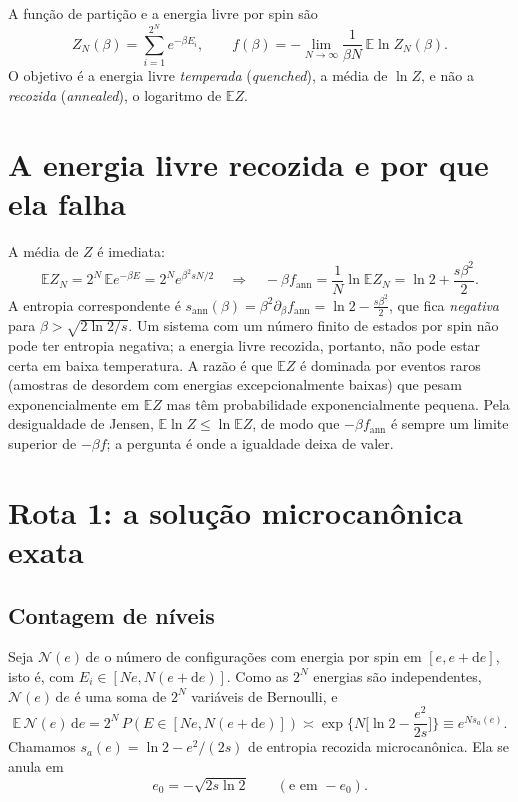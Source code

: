 \documentclass[11pt,a4paper]{article}
\newcommand{\E}{\mathbb{E}}
\newcommand{\dd}{\mathrm{d}}
\begin{document}
A função de partição e a energia livre por spin são
\begin{equation}
  Z_N(\beta)=\sum_{i=1}^{2^N} e^{-\beta E_i},
  \qquad
  f(\beta)=-\lim_{N\to\infty}\frac{1}{\beta N}\,\E\ln Z_N(\beta).
\end{equation}
O objetivo é a energia livre \emph{temperada} (\emph{quenched}), a média de $\ln Z$, e não a
\emph{recozida} (\emph{annealed}), o logaritmo de $\E Z$.

\section{A energia livre recozida e por que ela falha}

A média de $Z$ é imediata:
\begin{equation}
  \E Z_N = 2^N\,\E e^{-\beta E}=2^N e^{\beta^2 sN/2}
  \quad\Longrightarrow\quad
  -\beta f_{\text{ann}}=\frac1N\ln\E Z_N=\ln 2+\frac{s\beta^2}{2}.
  \label{eq:annealed}
\end{equation}
A entropia correspondente é $s_{\text{ann}}(\beta)=\beta^2\partial_\beta f_{\text{ann}}=\ln2-\tfrac{s\beta^2}{2}$,
que fica \emph{negativa} para $\beta>\sqrt{2\ln2/s}$. Um sistema com um número finito de estados por spin
não pode ter entropia negativa; a energia livre recozida, portanto, não pode estar certa em baixa
temperatura. A razão é que $\E Z$ é dominada por eventos raros (amostras de desordem com energias
excepcionalmente baixas) que pesam exponencialmente em $\E Z$ mas têm probabilidade exponencialmente
pequena. Pela desigualdade de Jensen, $\E\ln Z\le\ln\E Z$, de modo que $-\beta f_{\text{ann}}$ é sempre um
limite superior de $-\beta f$; a pergunta é onde a igualdade deixa de valer.

\section{Rota 1: a solução microcanônica exata}
\label{sec:micro}

\subsection{Contagem de níveis}
Seja $\mathcal N(e)\,\dd e$ o número de configurações com energia por spin em $[e,e+\dd e]$, isto é,
com $E_i\in[Ne,N(e+\dd e)]$. Como as $2^N$ energias são independentes, $\mathcal N(e)\,\dd e$ é uma soma
de $2^N$ variáveis de Bernoulli, e
\begin{equation}
  \E\,\mathcal N(e)\,\dd e = 2^N\,P(E\in[Ne,N(e+\dd e)])
  \asymp \exp\!\Big\{N\Big[\ln2-\frac{e^2}{2s}\Big]\Big\}
  \equiv e^{N s_a(e)} .
  \label{eq:media-nivel}
\end{equation}
Chamamos $s_a(e)=\ln2-e^2/(2s)$ de entropia recozida microcanônica. Ela se anula em
\begin{equation}
  e_0=-\sqrt{2s\ln2}\qquad(\text{e em } -e_0).
\end{equation}
\end{document}

